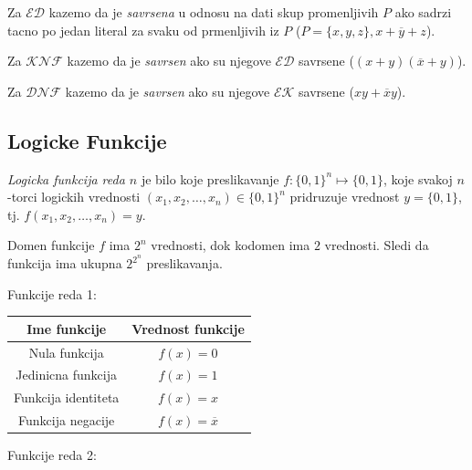 \documentclass[12p,a4paper]{article}
\begin{document}
\begin{multicols}{2}
    Za $\mathcal{ED}$ kazemo da je \emph{savrsena} u odnosu na dati skup 
    promenljivih $P$ ako sadrzi tacno po jedan literal za svaku od
    prmenljivih iz $P$ ($P = \{x, y, z\}, x + \overline{y} + z$).

    Za $\mathcal{KNF}$ kazemo da je \emph{savrsen} ako su njegove 
    $\mathcal{ED}$ savrsene ($(x + y) (\overline{x} + y)$).

    Za $\mathcal{DNF}$ kazemo da je \emph{savrsen} ako su njegove 
    $\mathcal{EK}$ savrsene ($xy + \overline{x}y$).

    \subsection{Logicke Funkcije}
    
    \emph{Logicka funkcija reda $n$} je bilo koje preslikavanje
    $f: {\{0, 1\}}^n \mapsto \{0, 1\}$, koje svakoj $n$-torci logickih 
    vrednosti $(x_1, x_2, \ldots, x_n) \in {\{0, 1\}}^n$ pridruzuje vrednost
    $y = \{0, 1\}$, tj. $f(x_1, x_2, \ldots, x_n) = y$.

    Domen funkcije $f$ ima $2^n$ vrednosti, dok kodomen ima $2$ vrednosti. 
    Sledi da funkcija ima ukupna $2^{2^n}$ preslikavanja.

    Funkcije reda 1:

    \begin{tabular}{*{2}{c}}
        Ime funkcije        & Vrednost funkcije \\
        \midrule
        Nula funkcija       & $f(x) = 0$ \\
        Jedinicna funkcija  & $f(x) = 1$ \\
        Funkcija identiteta & $f(x) = x$ \\
        Funkcija negacije   & $f(x) = \overline{x}$ \\
    \end{tabular}

    Funkcije reda 2:


\end{multicols}
\end{document}

